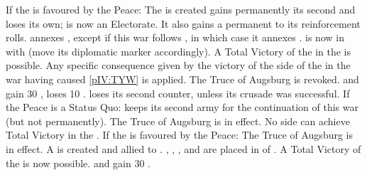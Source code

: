 \begin{digressions}


  \aparag If the \ligue is favoured by the Peace:
  \bparag The  is created
  \bparag \paysBaviere gains permanently its second \ARMY and \paysPalatinat
  loses its own; \paysBaviere is now an Electorate.  It also gains a permanent
   to its reinforcement rolls.
  \bparag \paysBaviere annexes \provinceOberPfalz, except if this war follows
  , in which case it annexes
  \provinceSchwaben.
  \bparag \paysBaviere is now in \AM with \HAB (move its diplomatic marker
  accordingly).
  \bparag A Total Victory of the \ligue in the  is possible.
  \bparag Any specific consequence given by the victory of the side of the
  \ligue in the war having caused \ref{pIV:TYW} is applied.
  \bparag The Truce of Augsburg is revoked.
  \bparag \SPA and \AUS gain 30 \PV, \SUE loses 10 \PV.
  \bparag \DANdan loses its second \ARMY counter, unless its crusade was
  successful.
  \aparag If the Peace is a Status Quo:
  \bparag \paysBaviere keeps its second army for the continuation of this war
  (but not permanently).
  \bparag The Truce of Augsburg is in effect.
  \bparag No side can achieve Total Victory in the .
  \aparag If the \alliance is favoured by the Peace:
  \bparag The Truce of Augsburg is in effect.
  \bparag A  is created and allied to
  \HOL.
  \bparag \paysOldenburg, \paysHanovre, \paysHesse, \paysHanse and \paysBerg
  are placed in \EG of \HOL.
  \bparag A Total Victory of the \alliance is now possible.
  \bparag \HOL and \SUE gain 30 \PV.



\end{digressions}
